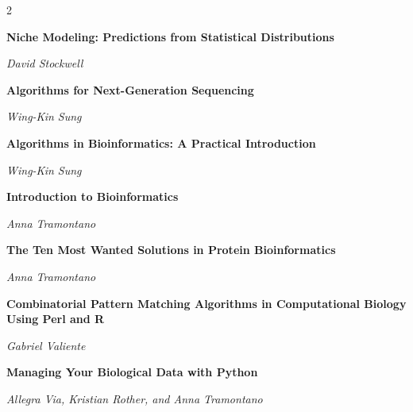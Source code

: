 \begin{multicols}{2}
\begin{minipage}{\linewidth}
\end{minipage}\par\medskip
\par\noindent\begin{minipage}{\linewidth}
\raggedright
\textbf{Niche Modeling: Predictions from Statistical Distributions}\par
\textit{David Stockwell}
\end{minipage}\par\medskip
\par\noindent\begin{minipage}{\linewidth}
\raggedright
\textbf{Algorithms for Next-Generation Sequencing}\par
\textit{Wing-Kin Sung}
\end{minipage}\par\medskip
\par\noindent\begin{minipage}{\linewidth}
\raggedright
\textbf{Algorithms in Bioinformatics: A Practical Introduction}\par
\textit{Wing-Kin Sung}
\end{minipage}\par\medskip
\par\noindent\begin{minipage}{\linewidth}
\raggedright
\textbf{Introduction to Bioinformatics}\par
\textit{Anna Tramontano}
\end{minipage}\par\medskip
\par\noindent\begin{minipage}{\linewidth}
\raggedright
\textbf{The Ten Most Wanted Solutions in Protein Bioinformatics}\par
\textit{Anna Tramontano}
\end{minipage}\par\medskip
\par\noindent\begin{minipage}{\linewidth}
\raggedright
\textbf{Combinatorial Pattern Matching Algorithms in Computational Biology Using Perl and R}\par
\textit{Gabriel Valiente}
\end{minipage}\par\medskip
\par\noindent\begin{minipage}{\linewidth}
\raggedright
\textbf{Managing Your Biological Data with Python}\par
\textit{Allegra Via, Kristian Rother, and Anna Tramontano}

\end{minipage}
\end{multicols}
